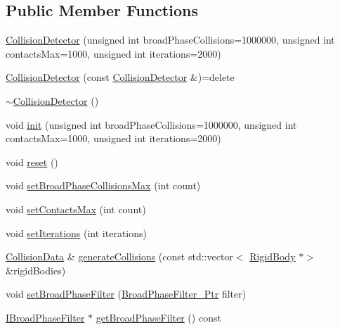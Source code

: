 \subsection*{Public Member Functions}
\begin{DoxyCompactItemize}
\item 
\mbox{\hyperlink{classr3_1_1_collision_detector_a47ab392bc5215133e29cd678ef915108}{Collision\+Detector}} (unsigned int broad\+Phase\+Collisions=1000000, unsigned int contacts\+Max=1000, unsigned int iterations=2000)
\item 
\mbox{\hyperlink{classr3_1_1_collision_detector_ad44d67dd15e661d0e135016c89a7c9a4}{Collision\+Detector}} (const \mbox{\hyperlink{classr3_1_1_collision_detector}{Collision\+Detector}} \&)=delete
\item 
\mbox{\hyperlink{classr3_1_1_collision_detector_ab45ac57f6ab9bcab367e104e9423722a}{$\sim$\+Collision\+Detector}} ()
\item 
void \mbox{\hyperlink{classr3_1_1_collision_detector_a396e4c5db21eddfadb52533bdc7db08a}{init}} (unsigned int broad\+Phase\+Collisions=1000000, unsigned int contacts\+Max=1000, unsigned int iterations=2000)
\item 
void \mbox{\hyperlink{classr3_1_1_collision_detector_a8f9f9e0ecc67d950e79d024803dc916b}{reset}} ()
\item 
void \mbox{\hyperlink{classr3_1_1_collision_detector_a386e4e4027a98c154423c8aea9079138}{set\+Broad\+Phase\+Collisions\+Max}} (int count)
\item 
void \mbox{\hyperlink{classr3_1_1_collision_detector_a1920971e75d79df7806a8d803a010e62}{set\+Contacts\+Max}} (int count)
\item 
void \mbox{\hyperlink{classr3_1_1_collision_detector_a4d6081592ca35150cd6c8fe0d551c64d}{set\+Iterations}} (int iterations)
\item 
\mbox{\hyperlink{classr3_1_1_collision_data}{Collision\+Data}} \& \mbox{\hyperlink{classr3_1_1_collision_detector_a58a1bd9705f241e4c137458bed35f596}{generate\+Collisions}} (const std\+::vector$<$ \mbox{\hyperlink{classr3_1_1_rigid_body}{Rigid\+Body}} $\ast$$>$ \&rigid\+Bodies)
\item 
void \mbox{\hyperlink{classr3_1_1_collision_detector_a2184ca2db73a6446cf028e3b742c7cc4}{set\+Broad\+Phase\+Filter}} (\mbox{\hyperlink{classr3_1_1_collision_detector_aa8ed51d53c6f6ce545c93ad0e356d6de}{Broad\+Phase\+Filter\+\_\+\+Ptr}} filter)
\item 
\mbox{\hyperlink{classr3_1_1_i_broad_phase_filter}{I\+Broad\+Phase\+Filter}} $\ast$ \mbox{\hyperlink{classr3_1_1_collision_detector_aa4d1c9560f806496b2215ddc623a1387}{get\+Broad\+Phase\+Filter}} () const
$$
\end{DoxyCompactItemize}
